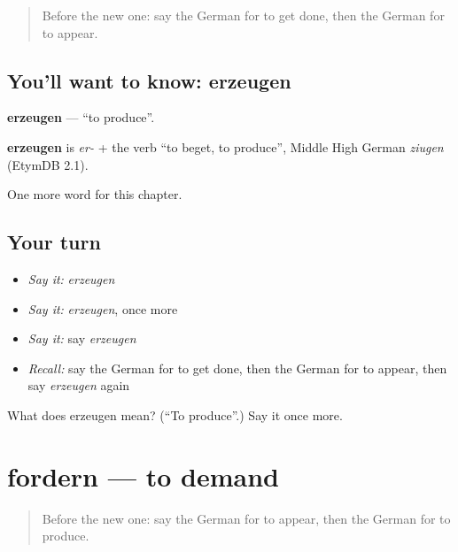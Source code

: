 \label{lesson:GE-C249-erzeugen}



\begin{quote}
Before the new one: say the German for to get done, then the German for to appear.
\end{quote}

\subsection*{You'll want to know: erzeugen}
\textbf{erzeugen} — \textquotedblleft{}to produce\textquotedblright{}.

\begin{cousinweb}
\textbf{erzeugen} is \emph{er-} + the verb \textquotedblleft{}to beget, to produce\textquotedblright{}, Middle High German \emph{ziugen} (EtymDB 2.1).
\end{cousinweb}

\begin{grammarlens}[title={What you've built}]
One more word for this chapter.
\end{grammarlens}

\subsection*{Your turn}
\begin{itemize}
\raggedright
  \item \emph{Say it:} \emph{erzeugen}
  \item \emph{Say it:} \emph{erzeugen}, once more
  \item \emph{Say it:} say \emph{erzeugen}
  \item \emph{Recall:} say the German for to get done, then the German for to appear, then say \emph{erzeugen} again
\end{itemize}

\begin{tcolorbox}[breakable,colback=teal!4,colframe=teal!35!black,title={Before you move on}]
What does erzeugen mean? (\textquotedblleft{}To produce\textquotedblright{}.) Say it once more.
\end{tcolorbox}
\section[fordern]{fordern — to demand}

\label{lesson:GE-C249-fordern}



\begin{quote}
Before the new one: say the German for to appear, then the German for to produce.
\end{quote}

